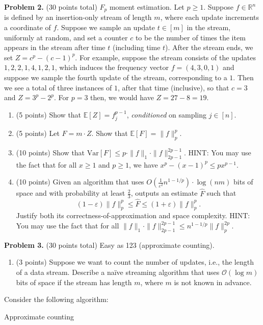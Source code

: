 \documentclass[11pt]{article}
\newcommand{\Ex}[1]{\ensuremath{\mathbb{E}\left[#1\right]}}
\newcommand{\Var}[1]{\ensuremath{\text{Var}\left[#1\right]}}
\newcommand{\eps}{\varepsilon}
\begin{document}
\vskip 0.2in\noindent
\textbf{Problem 2.} (30 points total)
$F_p$ moment estimation. 
\vskip 0.1in\noindent
Let $p\ge 1$. 
Suppose $f\in\mathbb{R}^n$ is defined by an insertion-only stream of length $m$, where each update increments a coordinate of $f$. 
Suppose we sample an update $t\in[m]$ in the stream, uniformly at random, and set a counter $c$ to be the number of times the item appears in the stream after time $t$ (including time $t$). 
After the stream ends, we set $Z=c^p-(c-1)^p$. 
\vskip 0.1in\noindent
For example, suppose the stream consists of the updates $1,2,2,1,4,1,2,1$, which induces the frequency vector $f=(4,3,0,1)$ and suppose we sample the fourth update of the stream, corresponding to a $1$. 
Then we see a total of three instances of $1$, after that time (inclusive), so that $c=3$ and $Z=3^p-2^p$. 
For $p=3$ then, we would have $Z=27-8=19$. 
\begin{enumerate}
\item (5 points)
Show that $\Ex{Z}=f_j^{p-1}$, \emph{conditioned} on sampling $j\in[n]$.
\item (5 points)
Let $F=m\cdot Z$. 
Show that $\Ex{F}=\|f\|_p^p$. 
\item (10 points)
Show that $\Var{F}\le p\cdot\|f\|_1\cdot\|f\|_{2p-1}^{2p-1}$. 
\vskip 0.1in\noindent
HINT: You may use the fact that for all $x\ge 1$ and $p\ge 1$, we have $x^p-(x-1)^p\le px^{p-1}$. 
\item (10 points)
Given an algorithm that uses $O\left(\frac{1}{\eps^2}n^{1-1/p}\right)\cdot\log(nm)$ bits of space and with probability at least $\frac{2}{3}$, outputs an estimate $\widehat{F}$ such that
\[(1-\eps)\|f\|_p^p\le\widehat{F}\le(1+\eps)\|f\|_p^p.\]
Justify both its correctness-of-approximation and space complexity. 
\vskip 0.1in\noindent
HINT: You may use the fact that for all $\|f\|_1\cdot\|f\|_{2p-1}^{2p-1}\le n^{1-1/p}\|f\|_p^{2p}$. 
\end{enumerate}
\vskip 0.2in\noindent
\textbf{Problem 3.} (30 points total)
Easy as 123 (approximate counting).
\begin{enumerate}
\item (3 points)
Suppose we want to count the number of updates, i.e., the length of a data stream. 
Describe a na\"{i}ve streaming algorithm that uses $\mathcal{O}(\log m)$ bits of space if the stream has length $m$, where $m$ is not known in advance. 
\end{enumerate}
Consider the following algorithm:
\begin{algorithm}[!htb]
\caption{Approximate counting}
\begin{algorithmic}[1]
\EndIf
\EndFor
{}
\end{algorithmic}
\end{algorithm}
\end{document}
